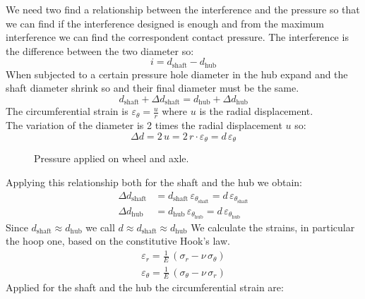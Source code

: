 \documentclass[a4paper,12pt]{article}
\begin{document}
We need two find a relationship between the interference and the pressure so that we can find if the interference designed is enough and from the maximum interference we can find the correspondent contact pressure.
The interference is the difference between the two diameter so:
\begin{equation}
\label{eq:interference}
i = d_\text{shaft} -d_\text{hub}
\end{equation}
When subjected to a certain pressure hole diameter in the hub expand and the shaft diameter shrink so and their final diameter must be the same.
\begin{equation}
\label{eq:diameters_equal}
d_\text{shaft} + \Delta d_\text{shaft} = d_\text{hub} + \Delta d_\text{hub}
\end{equation} 
The circumferential strain is $\varepsilon_\theta = \frac{u}{r}$ where $u$ is the radial displacement. 
\\The variation of the diameter is 2 times the radial displacement $u$ so:
\begin{equation}
\label{eq:delta_diameter}
\Delta d = 2\, u = 2\, r \cdot \varepsilon_\theta = d \, \varepsilon_\theta
\end{equation}
\begin{figure}[H]
\centering     %
\caption{Pressure applied on wheel and axle.}
\qquad
{}
\label{fig:shaft_hub_pressure}
\end{figure}
Applying this relationship both for the shaft and the hub we obtain:
\begin{align}
\Delta d_\text{shaft} &=  d_\text{shaft} \, \varepsilon_{\theta_\text{shaft}} =  d \, \varepsilon_{\theta_\text{shaft}} \\
\Delta d_\text{hub} &=  d_\text{hub} \, \varepsilon_{\theta_\text{hub}} =  d \, \varepsilon_{\theta_\text{hub}}
\end{align}
Since $d_\text{shaft} \approx d_\text{hub}$ we call $d \approx d_\text{shaft} \approx d_\text{hub}$
We calculate the strains, in particular the hoop one, based on the constitutive Hook's law.
\begin{align}
\varepsilon_{r} = \frac{1}{E}\, (\sigma_r - \nu \, \sigma_\theta)\\
\varepsilon_{\theta} = \frac{1}{E}\, (\sigma_\theta - \nu \, \sigma_r)
\end{align}
Applied for the shaft and the hub the circumferential strain are:
\end{document}
